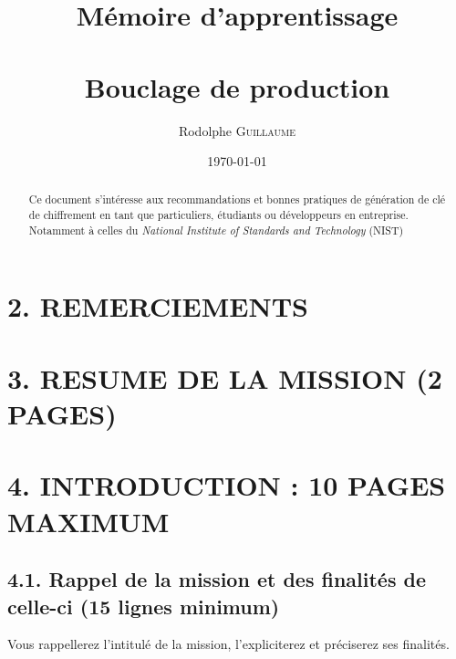 \documentclass[a4paper, 12pt]{article}
\title{
    Mémoire d'apprentissage\\
    \entreprise\\
    Bouclage de production
}
\author{
    Rodolphe \textsc{Guillaume} \\
    \epita 2020
}
\date{\today}
\begin{document}
\onehalfspacing %

\renewcommand{\listfigurename}{Table des illustrations}
\renewcommand{\figurename}{Illustration}
\renewcommand{\tablename}{Tableau}
\renewcommand{\contentsname}{Sommaire}

\maketitle
\thispagestyle{empty}
\newpage{}

\begin{abstract}
Ce document s'intéresse aux recommandations et bonnes pratiques de génération de clé de chiffrement en tant que particuliers, étudiants ou développeurs en entreprise. Notamment à celles du \textit{National Institute of Standards and Technology} (\textsc{NIST})
\end{abstract}

\tableofcontents
\thispagestyle{empty}
\newpage{}

\setcounter{page}{1}

\section{2. REMERCIEMENTS}

    
    \newpage{}

\section{3. RESUME DE LA MISSION (2 PAGES)}

    
    \newpage{}

\section{4. INTRODUCTION : 10 PAGES MAXIMUM}


\subsection{4.1. Rappel de la mission et des finalités de celle-ci (15 lignes minimum)}

    

Vous rappellerez l’intitulé de la mission, l’expliciterez et préciserez ses finalités.
\end{document}

